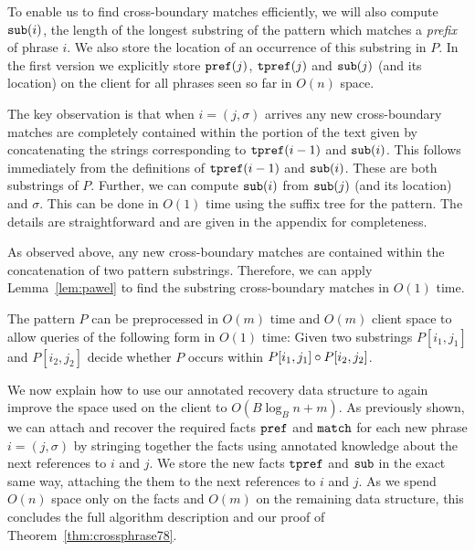 To enable us to find cross-boundary matches efficiently, we will also compute $\mathtt{sub}(i)$, the length of the longest substring of the pattern which matches a \emph{prefix} of phrase $i$.  We also store the location of an occurrence of this substring in $P$. In the first version we explicitly store $\mathtt{pref}(j)$, $\mathtt{tpref}(j)$ and $\mathtt{sub}(j)$ (and its location) on the client for all phrases seen so far in $O(n)$ space.

The key observation is that when $i=(j,\sigma)$ arrives any new cross-boundary matches are completely contained within the portion of the text given by concatenating the strings corresponding to $\mathtt{tpref}(i-1)$ and  $\mathtt{sub}(i)$. This follows immediately from the definitions of $\mathtt{tpref}(i-1)$ and  $\mathtt{sub}(i)$. These are both substrings of $P$. Further, we can compute $\mathtt{sub}(i)$ from  $\mathtt{sub}(j)$ (and its location) and $\sigma$. This can be done in $O(1)$ time using the suffix tree for the pattern. The details are straightforward and are given in the appendix for completeness.

As observed above, any new cross-boundary matches are contained within the concatenation of two pattern substrings. Therefore, we can apply Lemma~\ref{lem:pawel} to find the substring cross-boundary matches in $O(1)$ time.

\begin{lemma}\label{lem:pawel}
The pattern $P$ can be preprocessed in $O(m)$ time and $O(m)$ client space to allow queries of the following form in $O(1)$ time: Given two substrings $P[i_1,j_1]$ and $P[i_2,j_2]$ decide whether $P$ occurs within $P[i_1,j_1] \circ P[i_2,j_2]$.
\end{lemma}

We now explain how to use our annotated recovery data structure to again improve the space used on the client to $O(B \log_B n + m)$. As previously shown, we can attach and recover the required facts $\mathtt{pref}$ and $\mathtt{match}$ for each new phrase $i = (j, \sigma)$ by stringing together the facts using annotated knowledge about the next references to $i$ and $j$. We store the new facts $\mathtt{tpref}$ and $\mathtt{sub}$ in the exact same way, attaching the them to the next references to $i$ and $j$. As we spend $O(n)$ space only on the facts and $O(m)$ on the remaining data structure, this concludes the full algorithm description and our proof of Theorem~\ref{thm:crossphrase78}. 

%
%

